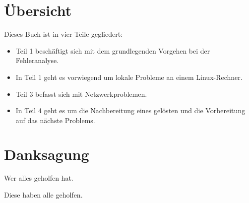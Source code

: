 \begin{normaltext}
\end{normaltext}

\section*{Übersicht}
\label{sec:ubersicht}

\begin{normaltext}
  Dieses Buch ist in vier Teile gegliedert:
  \begin{itemize}
  \item Teil 1 beschäftigt sich mit dem grundlegenden Vorgehen bei der
    Fehleranalyse.
  \item In Teil 1 geht es vorwiegend um lokale Probleme an einem
    Linux-Rechner.
  \item Teil 3 befasst sich mit Netzwerkproblemen.
  \item In Teil 4 geht es um die Nachbereitung eines gelösten und die
    Vorbereitung auf das nächste Problems.
  \end{itemize}
\end{normaltext}

\section*{Danksagung}
\label{sec:problemstellung}

\begin{abstractsec}
  Wer alles geholfen hat.
\end{abstractsec}
\begin{normaltext}
  Diese haben alle geholfen.
\end{normaltext}


